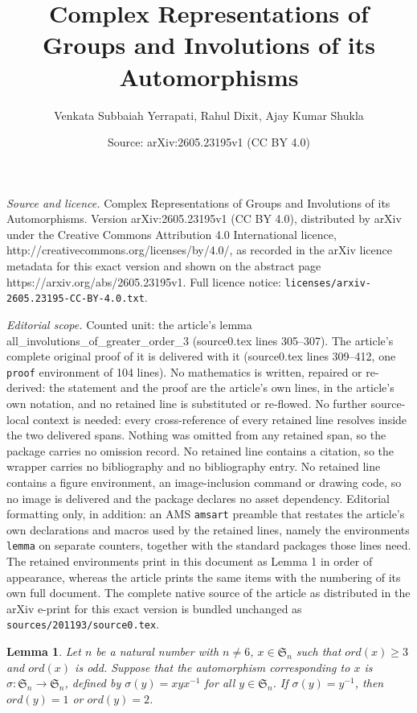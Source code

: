 \documentclass[10pt,a4paper]{amsart}
\title{Complex Representations of Groups and Involutions of its Automorphisms}
\author{Venkata Subbaiah Yerrapati, Rahul Dixit, Ajay Kumar Shukla}
\date{Source: arXiv:2605.23195v1 (CC BY 4.0)}
\newtheorem{lemma}{Lemma}
\newcommand{\ord}{ord}
\begin{document}
\maketitle

\noindent\emph{Source and licence.} Complex Representations of Groups and Involutions of its Automorphisms. Version arXiv:2605.23195v1 (CC BY 4.0), distributed by arXiv under the Creative Commons Attribution 4.0 International licence, http://creativecommons.org/licenses/by/4.0/, as recorded in the arXiv licence metadata for this exact version and shown on the abstract page https://arxiv.org/abs/2605.23195v1. Full licence notice: \texttt{licenses/arxiv-2605.23195-CC-BY-4.0.txt}.\par\smallskip

\noindent\textit{Editorial scope.} Counted unit: the article's lemma all\_involutions\_of\_greater\_order\_3 (source0.tex lines 305--307). The article's complete original proof of it is delivered with it (source0.tex lines 309--412, one \texttt{proof} environment of 104 lines). No mathematics is written, repaired or re-derived: the statement and the proof are the article's own lines, in the article's own notation, and no retained line is substituted or re-flowed.  No further source-local context is needed: every cross-reference of every retained line resolves inside the two delivered spans.  Nothing was omitted from any retained span, so the package carries no omission record.  No retained line contains a citation, so the wrapper carries no bibliography and no bibliography entry.  No retained line contains a figure environment, an image-inclusion command or drawing code, so no image is delivered and the package declares no asset dependency.  Editorial formatting only, in addition: an AMS \texttt{amsart} preamble that restates the article's own declarations and macros used by the retained lines, namely the environments \texttt{lemma} on separate counters, together with the standard packages those lines need.  The retained environments print in this document as Lemma 1 in order of appearance, whereas the article prints the same items with the numbering of its own full document.  The complete native source of the article as distributed in the arXiv e-print for this exact version is bundled unchanged as \texttt{sources/201193/source0.tex}.
    \begin{lemma}\label{all_involutions_of_greater_order_3}
            Let $n$ be a natural number with $n \neq 6$, $x\in\mathfrak{S}_n$ such that $\ord (x) \geq 3$ and $\ord(x)$ is odd. Suppose that the automorphism corresponding to $x$ is $\sigma : \mathfrak{S}_n \rightarrow \mathfrak{S}_n$, defined by $\sigma(y) = xyx^{-1}$ for all $y \in \mathfrak{S}_n$. If $\sigma(y) = y^{-1}$, then $\ord (y) = 1$ or $\ord (y) = 2$.
        \end{lemma}
\end{document}
